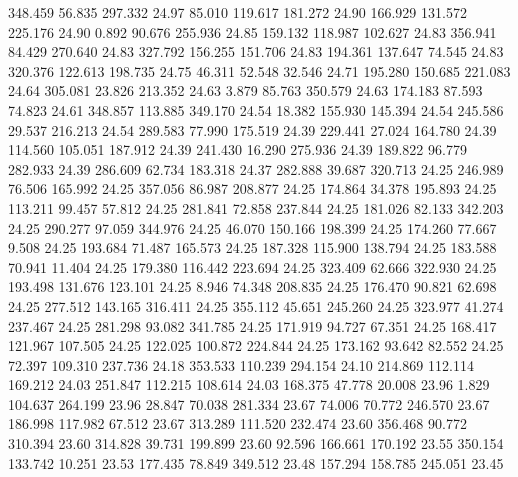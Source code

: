  348.459   56.835  297.332        24.97
  85.010  119.617  181.272        24.90
 166.929  131.572  225.176        24.90
   0.892   90.676  255.936        24.85
 159.132  118.987  102.627        24.83
 356.941   84.429  270.640        24.83
 327.792  156.255  151.706        24.83
 194.361  137.647   74.545        24.83
 320.376  122.613  198.735        24.75
  46.311   52.548   32.546        24.71
 195.280  150.685  221.083        24.64
 305.081   23.826  213.352        24.63
   3.879   85.763  350.579        24.63
 174.183   87.593   74.823        24.61
 348.857  113.885  349.170        24.54
  18.382  155.930  145.394        24.54
 245.586   29.537  216.213        24.54
 289.583   77.990  175.519        24.39
 229.441   27.024  164.780        24.39
 114.560  105.051  187.912        24.39
 241.430   16.290  275.936        24.39
 189.822   96.779  282.933        24.39
 286.609   62.734  183.318        24.37
 282.888   39.687  320.713        24.25
 246.989   76.506  165.992        24.25
 357.056   86.987  208.877        24.25
 174.864   34.378  195.893        24.25
 113.211   99.457   57.812        24.25
 281.841   72.858  237.844        24.25
 181.026   82.133  342.203        24.25
 290.277   97.059  344.976        24.25
  46.070  150.166  198.399        24.25
 174.260   77.667    9.508        24.25
 193.684   71.487  165.573        24.25
 187.328  115.900  138.794        24.25
 183.588   70.941   11.404        24.25
 179.380  116.442  223.694        24.25
 323.409   62.666  322.930        24.25
 193.498  131.676  123.101        24.25
   8.946   74.348  208.835        24.25
 176.470   90.821   62.698        24.25
 277.512  143.165  316.411        24.25
 355.112   45.651  245.260        24.25
 323.977   41.274  237.467        24.25
 281.298   93.082  341.785        24.25
 171.919   94.727   67.351        24.25
 168.417  121.967  107.505        24.25
 122.025  100.872  224.844        24.25
 173.162   93.642   82.552        24.25
  72.397  109.310  237.736        24.18
 353.533  110.239  294.154        24.10
 214.869  112.114  169.212        24.03
 251.847  112.215  108.614        24.03
 168.375   47.778   20.008        23.96
   1.829  104.637  264.199        23.96
  28.847   70.038  281.334        23.67
  74.006   70.772  246.570        23.67
 186.998  117.982   67.512        23.67
 313.289  111.520  232.474        23.60
 356.468   90.772  310.394        23.60
 314.828   39.731  199.899        23.60
  92.596  166.661  170.192        23.55
 350.154  133.742   10.251        23.53
 177.435   78.849  349.512        23.48
 157.294  158.785  245.051        23.45

